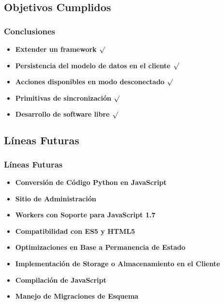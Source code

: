\documentclass{beamer}
\begin{document}
\subsection{Objetivos Cumplidos}
\begin{frame}
    \frametitle{Conclusiones}
    \begin{itemize}
        \item {\bf Extender un framework $\surd$}
        \item {\bf Persistencia del modelo de datos en el cliente $\surd$}
        \item {\bf Acciones disponibles en modo desconectado $\surd$}
        \item {\bf Primitivas de sincronización $\surd$}
        \item {\bf Desarrollo de software libre $\surd$}

    \end{itemize}
\end{frame}

\subsection{Líneas Futuras}
\begin{frame}
    \frametitle{Líneas Futuras}
    \begin{itemize}
        \item{\bf Conversión de Código Python en JavaScript}
        \item{\bf Sitio de Administración}
        \item{\bf Workers con Soporte para JavaScript 1.7}
        \item{\bf Compatibilidad con ES5 y HTML5}
        \item{\bf Optimizaciones en Base a Permanencia de Estado}
        \item{\bf Implementación de Storage o Almacenamiento en el Cliente}
        \item{\bf Compilación de JavaScript}
        \item {\bf Manejo de Migraciones de Esquema}
    \end{itemize}
\end{frame}
\end{document}
